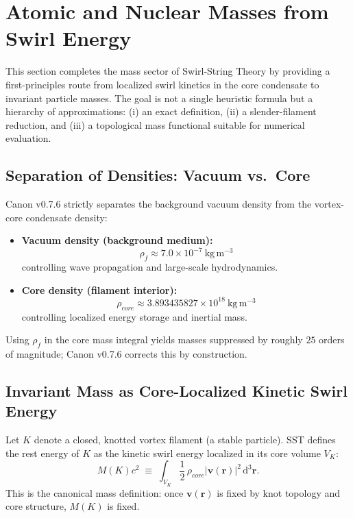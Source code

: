 \documentclass[10pt]{article}
\newcommand{\rhof}{\rho_{\!f}}                           %
\newcommand{\rhocore}{\rho_{core}}
\begin{document}
        
    \section{Atomic and Nuclear Masses from Swirl Energy}
    \label{sec:mass_expanded}

    This section completes the mass sector of Swirl-String Theory by providing a
    first-principles route from localized swirl kinetics in the core condensate to
    invariant particle masses. The goal is not a single heuristic formula but a
    hierarchy of approximations: (i) an exact definition, (ii) a slender-filament
    reduction, and (iii) a topological mass functional suitable for numerical
    evaluation.

    \subsection{Separation of Densities: Vacuum vs.\ Core}

        Canon v0.7.6 strictly separates the background vacuum density from the vortex-core
        condensate density:

        \begin{itemize}
            \item \textbf{Vacuum density (background medium):}
            \[
                \rhof \approx 7.0\times 10^{-7}\ \mathrm{kg\,m^{-3}}
            \]
            controlling wave propagation and large-scale hydrodynamics.
            \item \textbf{Core density (filament interior):}
            \[
                \rhocore \approx 3.893435827\times 10^{18}\ \mathrm{kg\,m^{-3}}
            \]
            controlling localized energy storage and inertial mass.
        \end{itemize}

        Using $\rhof$ in the core mass integral yields masses suppressed by roughly
        $25$ orders of magnitude; Canon v0.7.6 corrects this by construction.

    \subsection{Invariant Mass as Core-Localized Kinetic Swirl Energy}

        Let $K$ denote a closed, knotted vortex filament (a stable particle). SST defines
        the rest energy of $K$ as the kinetic swirl energy localized in its core volume
        $V_K$:
        \begin{equation}
            M(K)c^2
            \;\equiv\;
            \int_{V_K}
            \frac{1}{2}\,\rhocore
            \left|\mathbf{v}(\mathbf{r})\right|^2
            \,\mathrm{d}^3\mathbf{r}.
            \label{eq:mass_def_exact}
        \end{equation}
        This is the canonical mass definition: once $\mathbf{v}(\mathbf{r})$ is fixed by
        knot topology and core structure, $M(K)$ is fixed.
\end{document}
